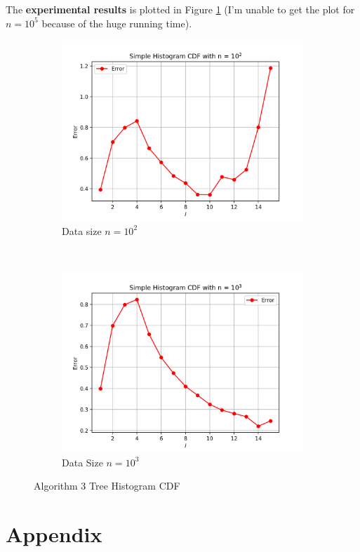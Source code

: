 \documentclass[11pt]{article}
\begin{document}
\begin{enumerate}
	The \textbf{experimental results} is plotted in Figure \ref{fig-alg3} (I'm unable to get the plot for $n = 10^5$ because of the huge running time).
		\begin{figure}[t!]
		    \centering
		    \begin{subfigure}[t]{0.4\textwidth}
		        \centering
		        \includegraphics[width=\textwidth]{alg3-1}
		        \caption{Data size $n = 10^2$}
		    \end{subfigure}%
		    ~ 
		    \begin{subfigure}[t]{0.4\textwidth}
		        \centering
		        \includegraphics[width=\textwidth]{alg3-2}
		        \caption{Data Size $n = 10^3$}
		    \end{subfigure}
		    \caption{Algorithm 3 Tree Histogram CDF}
		    \label{fig-alg3}
		\end{figure}
\end{enumerate}

\newpage
\section*{Appendix}

\end{document}
